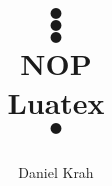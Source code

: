 \documentclass[landscape]{article}
\title{
\color{white}
 $\bullet$ \\ $\bullet$ \\ $\bullet$ \\
 \color{black}
 \color{black}
 NOP \\
Luatex \\
\color{white}
$\bullet$ \\
\color{black}
 \begin{center}
\end{center}
}
\author{Daniel Krah}
\begin{document}
\AddToShipoutPicture{\BackgroundPic}
\maketitle%
\newpage%



%
% 







% 
\newpage




% 



% 
% 
% 
% 

% 




% 
% 
% 
% 
% 
% 


% 






% 
% 
% 
% 
% 
% 
% 




%
\end{document}

